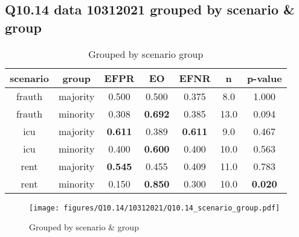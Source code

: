 \subsection{Q10.14 data 10312021 grouped by scenario \& group}

\begin{comment}
                        EFPR        EO      EFNR     n    pvalue
(frauth, majority)  0.500000  0.500000  0.375000   8.0  1.000000
(frauth, minority)  0.307692  0.692308  0.384615  13.0  0.093782
(icu, majority)     0.611111  0.388889  0.611111   9.0  0.466854
(icu, minority)     0.400000  0.600000  0.400000  10.0  0.563165
(rent, majority)    0.545455  0.454545  0.409091  11.0  0.782528
(rent, minority)    0.150000  0.850000  0.300000  10.0  0.019615
\end{comment}

\begin{table}[h]
    \centering
    \begin{tabular}{|c|c|c|c|c|c|c|}
        \hline
        scenario & group & EFPR & EO & EFNR & n & p-value\\
        \hline
        frauth & majority & 0.500 & 0.500 & 0.375 & 8.0 & 1.000\\
		frauth & minority & 0.308 & \textbf{0.692} & 0.385 & 13.0 & 0.094\\
		icu & majority & \textbf{0.611} & 0.389 & \textbf{0.611} & 9.0 & 0.467\\
		icu & minority & 0.400 & \textbf{0.600} & 0.400 & 10.0 & 0.563\\
		rent & majority & \textbf{0.545} & 0.455 & 0.409 & 11.0 & 0.783\\
		rent & minority & 0.150 & \textbf{0.850} & 0.300 & 10.0 & \textbf{0.020}\\
		
        \hline
    \end{tabular}
    \caption{Grouped by scenario group}
    \label{tab:my_label}
\end{table}
\begin{figure}[h]
    \centering
    \texttt{[image: figures/Q10.14/10312021/Q10.14\_scenario\_group.pdf]}
    \caption{Grouped by scenario \& group}
    \label{fig:my_label}
\end{figure}

